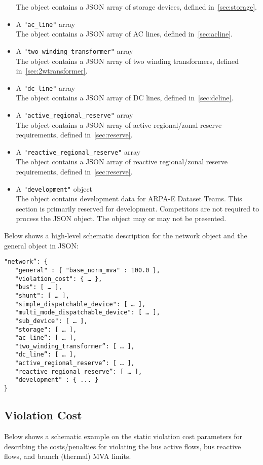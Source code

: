 \begin{itemize}
    The object contains a JSON array of storage devices, defined in~\ref{sec:storage}.
    \item A \texttt{"ac\_line"} array\\
    The object contains a JSON array of AC lines, defined in~\ref{sec:acline}.
    \item A \texttt{"two\_winding\_transformer"} array\\
    The object contains a JSON array of two winding transformers, defined in~\ref{sec:2wtransformer}.
    \item A \texttt{"dc\_line"} array\\
    The object contains a JSON array of DC lines, defined in~\ref{sec:dcline}.
    \item A \texttt{"active\_regional\_reserve"} array\\
    The object contains a JSON array of active regional/zonal reserve requirements, defined in~\ref{sec:reserve}.
    \item A \texttt{"reactive\_regional\_reserve"} array\\
    The object contains a JSON array of reactive regional/zonal reserve requirements, defined in~\ref{sec:reserve}.
    \item A \texttt{"development"} object\\
    The object contains development data for ARPA-E Dataset Teams. This section is primarily reserved for development. Competitors are not required to process the JSON object. The object may or may not be presented. 
\end{itemize}

Below shows a high-level schematic description for the network object and the general object in JSON:
\begin{verbatim}
"network”: {
   "general" : { "base_norm_mva" : 100.0 },
   "violation_cost": { … },
   "bus": [ … ],
   "shunt": [ … ],
   "simple_dispatchable_device": [ … ],
   "multi_mode_dispatchable_device": [ … ],
   "sub_device": [ … ],
   "storage": [ … ],
   "ac_line”: [ … ],
   "two_winding_transformer”: [ … ],
   "dc_line”: [ … ],   
   "active_regional_reserve”: [ … ],
   "reactive_regional_reserve”: [ … ],
   "development" : { ... }
}    
\end{verbatim}

\subsection{Violation Cost}
\label{sec:violation}
Below shows a schematic example on the static violation cost parameters for 
describing the costs/penalties for violating the bus active flows, bus reactive flows, 
and branch (thermal) MVA limits. 

